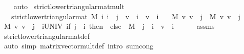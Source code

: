 \begin{isabellebody}
\ \ \isamarkupfalse%
\ auto%
\endisatagproof
{\isafoldproof}%
%
\isadelimproof
\isanewline
%
\endisadelimproof
\isanewline
{}\isamarkupfalse%
\ strict{\isacharunderscore}{\kern0pt}lower{\isacharunderscore}{\kern0pt}triangular{\isacharunderscore}{\kern0pt}mat{\isacharunderscore}{\kern0pt}mult{\isacharcolon}{\kern0pt}\isanewline
\ \ \ {\isachardoublequoteopen}strict{\isacharunderscore}{\kern0pt}lower{\isacharunderscore}{\kern0pt}triangular{\isacharunderscore}{\kern0pt}mat\ M{\isachardoublequoteclose}\ {\isachardoublequoteopen}{\isasymAnd}i{\isachardot}{\kern0pt}\ i\ {\isacharless}{\kern0pt}\ j\ {\isasymLongrightarrow}\ v\ {\isachardollar}{\kern0pt}\ i\ {\isacharequal}{\kern0pt}\ v{\isacharprime}{\kern0pt}\ {\isachardollar}{\kern0pt}\ i{\isachardoublequoteclose}\isanewline
\ \ \ {\isachardoublequoteopen}{\isacharparenleft}{\kern0pt}M\ {\isacharasterisk}{\kern0pt}v\ v{\isacharparenright}{\kern0pt}\ {\isachardollar}{\kern0pt}\ j\ {\isacharequal}{\kern0pt}\ {\isacharparenleft}{\kern0pt}M\ {\isacharasterisk}{\kern0pt}v\ v{\isacharprime}{\kern0pt}{\isacharparenright}{\kern0pt}\ {\isachardollar}{\kern0pt}\ j{\isachardoublequoteclose}\isanewline
%
\isadelimproof
%
\endisadelimproof
%
\isatagproof
{}\isamarkupfalse%
\ {\isacharminus}{\kern0pt}\isanewline
\ \ \isamarkupfalse%
\ {\isachardoublequoteopen}{\isacharparenleft}{\kern0pt}M\ {\isacharasterisk}{\kern0pt}v\ v{\isacharparenright}{\kern0pt}\ {\isachardollar}{\kern0pt}\ j\ {\isacharequal}{\kern0pt}\ {\isacharparenleft}{\kern0pt}{\isasymSum}i{\isasymin}UNIV{\isachardot}{\kern0pt}\ {\isacharparenleft}{\kern0pt}if\ j\ {\isasymle}\ i\ then\ {}\ else\ \ M\ {\isachardollar}{\kern0pt}\ j\ {\isachardollar}{\kern0pt}\ i\ {\isacharasterisk}{\kern0pt}\ v\ {\isachardollar}{\kern0pt}\ i{\isacharparenright}{\kern0pt}{\isacharparenright}{\kern0pt}{\isachardoublequoteclose}\isanewline
\ \ \ \ \isamarkupfalse%
\ assms\ \isamarkupfalse%
\ strict{\isacharunderscore}{\kern0pt}lower{\isacharunderscore}{\kern0pt}triangular{\isacharunderscore}{\kern0pt}mat{\isacharunderscore}{\kern0pt}def\isanewline
\ \ \ \ \isamarkupfalse%
\ {\isacharparenleft}{\kern0pt}auto\ simp{\isacharcolon}{\kern0pt}\ matrix{\isacharunderscore}{\kern0pt}vector{\isacharunderscore}{\kern0pt}mult{\isacharunderscore}{\kern0pt}def\ intro{\isacharbang}{\kern0pt}{\isacharcolon}{\kern0pt}\ sum{\isachardot}{\kern0pt}cong{\isacharparenright}{\kern0pt}\isanewline
\ \ \isamarkupfalse%
\ \isamarkupfalse%

\end{isabellebody}
